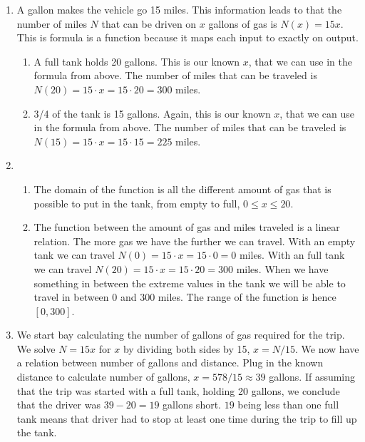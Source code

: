 \begin{enumerate}[label = (\alph*)]
  \item
    A gallon makes the vehicle go 15 miles. This information leads to that the number of miles $ N $ that can be driven on $ x $ gallons of gas is $ N(x) = 15x $. This is formula is a function because it maps each input to exactly on output.
    \begin{enumerate}[label = (\roman*)]
      \item
        A full tank holds 20 gallons. This is our known $ x $, that we can use in the formula from above. The number of miles that can be traveled is $ N(20) = 15 \cdot x = 15 \cdot 20 = 300 $ miles.
      \item
        3/4 of the tank is 15 gallons. Again, this is our known $ x $, that we can use in the formula from above. The number of miles that can be traveled is $ N(15) = 15 \cdot x = 15 \cdot 15 = 225 $ miles.
    \end{enumerate}
  \item
    \begin{enumerate}[label = (\roman*)]
      \item
        The domain of the function is all the different amount of gas that is possible to put in the tank, from empty to full, $ 0 \le x \le 20 $.
      \item
        The function between the amount of gas and miles traveled is a linear relation. The more gas we have the further we can travel. With an empty tank we can travel $ N(0) = 15 \cdot x = 15 \cdot 0 = 0 $ miles. With an full tank we can travel $ N(20) = 15 \cdot x = 15 \cdot 20 = 300 $ miles. When we have something in between the extreme values in the tank we will be able to travel in between 0 and 300 miles. The range of the function is hence $ [0,300] $.
    \end{enumerate}
  \item
    We start bay calculating the number of gallons of gas required for the trip. We solve $ N = 15x $ for $ x $ by dividing both sides by 15, $ x = N/15 $. We now have a relation between number of gallons and distance. Plug in the known distance to calculate number of gallons, $ x = 578 / 15 \approx 39 $ gallons. If assuming that the trip was started with a full tank, holding 20 gallons, we conclude that the driver was $ 39 - 20 = 19 $ gallons short. $ 19 $ being less than one full tank means that driver had to stop at least one time during the trip to fill up the tank.
\end{enumerate}

